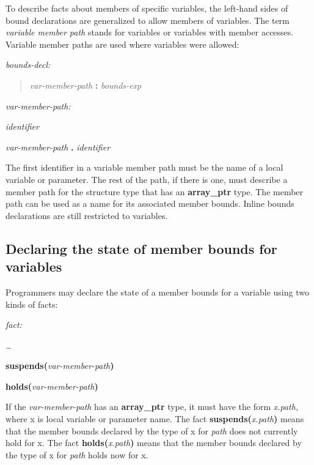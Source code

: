\documentclass[]{article}
\begin{document}
To describe facts about members of specific variables, the left-hand
sides of bound declarations are generalized to allow members of
variables. The term \emph{variable member path} stands for variables or
variables with member accesses. Variable member paths are used where
variables were allowed:

\emph{bounds-decl:}

\begin{quote}
\emph{var-member-path} \textbf{:} \emph{bounds-exp}
\end{quote}

\emph{var-member-path:}

\emph{identifier}

\emph{var-member-path} \textbf{.} \emph{identifier}

The first identifier in a variable member path must be the name of a
local variable or parameter. The rest of the path, if there is one, must
describe a member path for the structure type that has an
\textbf{array\_ptr} type. The member path can be used as a name for its
associated member bounds. Inline bounds declarations are still
restricted to variables.

\subsection{\texorpdfstring{\protect\hypertarget{ux5fToc420589199}{}{\protect\hypertarget{ux5fToc422906990}{}{\protect\hypertarget{ux5fToc424307705}{}{\protect\hypertarget{ux5fToc426641095}{}{\protect\hypertarget{ux5fToc435434977}{}{\protect\hypertarget{ux5fToc437460808}{}{\protect\hypertarget{ux5fToc440445489}{}{\protect\hypertarget{ux5fToc440449271}{}{\protect\hypertarget{ux5fToc440551921}{}{}}}}}}}}}Declaring
the state of member bounds for
variables}{Declaring the state of member bounds for variables}}\label{declaring-the-state-of-member-bounds-for-variables}

Programmers may declare the state of a member bounds for a variable
using two kinds of facts:

\emph{fact:}

\emph{\ldots{}}

\textbf{suspends(}\emph{var-member-path}\textbf{)}

\textbf{holds(}\emph{var-member-path}\textbf{)}

If the \emph{var-member-path} has an \textbf{array\_ptr} type, it must
have the form \emph{x.path,} where x is local variable or parameter
name. The fact \textbf{suspends(}\emph{x.path}\textbf{)} means that the
member bounds declared by the type of x for \emph{path} does not
currently hold for x. The fact \textbf{holds(}\emph{x.path}\textbf{)}
means that the member bounds declared by the type of x for \emph{path}
holds now for x.
\end{document}

